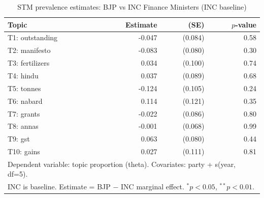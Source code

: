 \begin{table}[ht]
\centering
\caption{STM prevalence estimates: BJP vs INC Finance Ministers (INC baseline)}
\label{tab:stm_effects}
\begin{tabular}{lrrr}
\hline\hline
Topic & Estimate & (SE) & $p$-value \\
\hline
T1: outstanding & -0.047 & (0.084) & 0.58 \\
T2: manifesto & -0.083 & (0.080) & 0.30 \\
T3: fertilizers & 0.034 & (0.100) & 0.74 \\
T4: hindu & 0.037 & (0.089) & 0.68 \\
T5: tonnes & -0.124 & (0.105) & 0.24 \\
T6: nabard & 0.114 & (0.121) & 0.35 \\
T7: grants & -0.022 & (0.086) & 0.80 \\
T8: annas & -0.001 & (0.068) & 0.99 \\
T9: gst & 0.063 & (0.080) & 0.44 \\
T10: gains & 0.027 & (0.111) & 0.81 \\
\hline
\multicolumn{4}{l}{\footnotesize{Dependent variable: topic proportion (theta). Covariates: party + s(year, df=5).}} \\
\multicolumn{4}{l}{\footnotesize{INC is baseline. Estimate = BJP $-$ INC marginal effect. $^{*}p<0.05$, $^{**}p<0.01$.}} \\
\hline\hline
\end{tabular}
\end{table}
